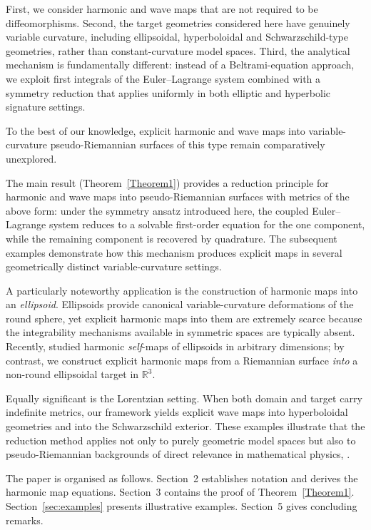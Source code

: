 \documentclass[12pt]{amsart}
\begin{document}
First, we consider harmonic and wave maps that are not required to be
diffeomorphisms. Second, the target geometries considered here have
genuinely variable curvature, including ellipsoidal, hyperboloidal and
Schwarzschild-type geometries, rather than constant-curvature model
spaces. Third, the analytical mechanism is fundamentally different:
instead of a Beltrami-equation approach, we exploit first integrals of
the Euler--Lagrange system combined with a symmetry reduction that
applies uniformly in both elliptic and hyperbolic signature settings.

To the best of our knowledge, explicit harmonic and wave maps into
variable-curvature pseudo-Riemannian surfaces of this type remain
comparatively unexplored.

The main result (Theorem~\ref{Theorem1}) provides a reduction
principle for harmonic and wave maps into pseudo-Riemannian surfaces
with metrics of the above form: under the symmetry ansatz introduced
here, the coupled Euler--Lagrange system reduces to a solvable
first-order equation for the one component, while the remaining
component is recovered by quadrature. The subsequent examples
demonstrate how this mechanism produces explicit maps in several
geometrically distinct variable-curvature settings.

A particularly noteworthy application is the construction of harmonic
maps into an \emph{ellipsoid}. Ellipsoids provide canonical
variable-curvature deformations of the round sphere, yet explicit
harmonic maps into them are extremely scarce because the integrability
mechanisms available in symmetric spaces are typically absent.
Recently, \cite{BrandingSiffert} studied harmonic \emph{self}-maps of
ellipsoids in arbitrary dimensions; by contrast, we construct explicit
harmonic maps from a Riemannian surface \emph{into} a non-round
ellipsoidal target in $\mathbb{R}^{3}$.

Equally significant is the Lorentzian setting. When both domain and
target carry indefinite metrics, our framework yields explicit
wave maps into hyperboloidal geometries and into the Schwarzschild
exterior. These examples illustrate that the reduction method applies
not only to purely geometric model spaces but also to pseudo-Riemannian
backgrounds of direct relevance in mathematical physics, \cite{Oneil}.


The paper is organised as follows. Section~2 establishes notation
and derives the harmonic map equations. Section~3 contains the proof
of Theorem~\ref{Theorem1}. Section~\ref{sec:examples} presents
illustrative examples. Section~5 gives concluding remarks.
\end{document}
